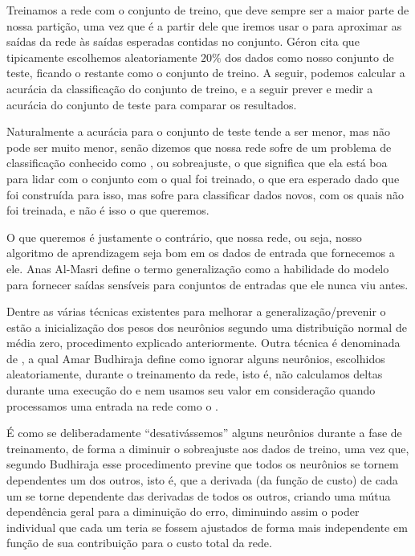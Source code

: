 Treinamos a rede com o conjunto de treino, que deve sempre ser a maior parte de nossa partição, uma vez que é a partir dele que iremos usar o  para aproximar as saídas da rede às saídas esperadas contidas no conjunto. Géron \citep{hands} cita que tipicamente escolhemos aleatoriamente $20\%$ dos dados como nosso conjunto de teste, ficando o restante como o conjunto de treino. A seguir, podemos calcular a acurácia da classificação do conjunto de treino, e a seguir prever e medir a acurácia do conjunto de teste para comparar os resultados. 

Naturalmente a acurácia para o conjunto de teste tende a ser menor, mas não pode ser muito menor, senão dizemos que nossa rede sofre de um problema de classificação conhecido como , ou sobreajuste, o que significa que ela está boa para lidar com o conjunto com o qual foi treinado, o que era esperado dado que foi construída para isso, mas sofre para classificar dados novos, com os quais não foi treinada, e não é isso o que queremos. 

O que queremos é justamente o contrário, que nossa rede, ou seja, nosso algoritmo de aprendizagem seja bom em  os dados de entrada que fornecemos a ele. Anas Al-Masri \citep{network_1} define o termo generalização como a habilidade do modelo para fornecer saídas sensíveis para conjuntos de entradas que ele nunca viu antes. 

Dentre as várias técnicas existentes para melhorar a generalização/prevenir o  estão a inicialização dos pesos dos neurônios segundo uma distribuição normal de média zero, procedimento explicado anteriormente. Outra técnica é denominada de , a qual Amar Budhiraja \citep{network_2} define como ignorar alguns neurônios, escolhidos aleatoriamente, durante o treinamento da rede, isto é, não calculamos deltas durante uma execução do  e nem usamos seu valor em consideração quando processamos uma entrada na rede como o .

É como se deliberadamente ``desativássemos'' alguns neurônios durante a fase de treinamento, de forma a diminuir o sobreajuste aos dados de treino, uma vez que, segundo Budhiraja \citep{network_2} esse procedimento previne que todos os neurônios se tornem dependentes um dos outros, isto é, que a derivada (da função de custo) de cada um se torne dependente das derivadas de todos os outros, criando uma mútua dependência geral para a diminuição do erro, diminuindo assim o poder individual que cada um teria se fossem ajustados de forma mais independente em função de sua contribuição para o custo total da rede.

